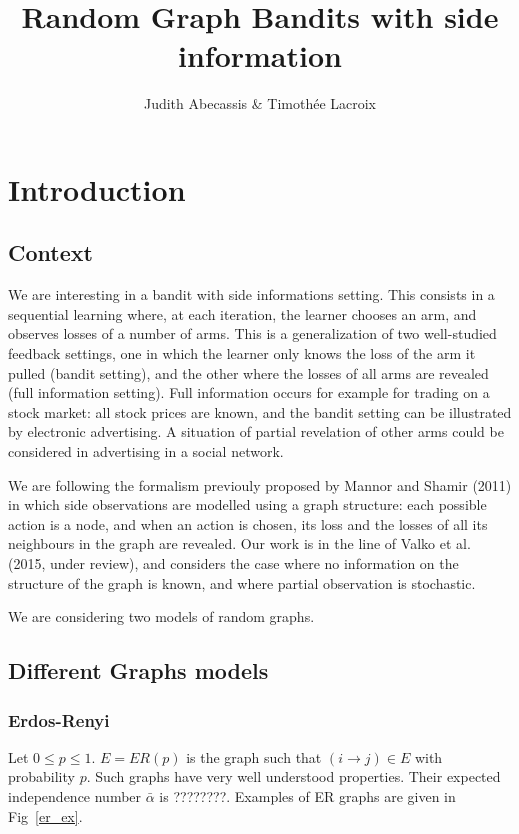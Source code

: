 \documentclass[10pt,a4paper]{scrartcl}
\author{Judith Abecassis \& Timothée Lacroix}
\title{Random Graph Bandits with side information}
\begin{document}
\maketitle

\section{Introduction}
\subsection{Context}
We are interesting in a bandit with side informations setting. This consists in a sequential learning where, at each iteration, the learner chooses an arm, and observes losses of a number of arms. This is a generalization of two well-studied feedback settings, one in which the learner only knows the loss of the arm it pulled (bandit setting), and the other where the losses of all arms are revealed (full information setting). Full information occurs for example for trading on a stock market: all stock prices are known, and the bandit setting can be illustrated by electronic advertising. A situation of partial revelation of other arms could be considered in advertising in a social network.

We are following the formalism previouly proposed by Mannor and Shamir (2011) in which side observations are modelled using a graph structure: each possible action is a node, and when an action is chosen, its loss and the losses of all its neighbours in the graph are revealed. Our work is in the line of Valko et al. (2015, under review), and considers the case where no information on the structure of the graph is known, and where partial observation is stochastic. 

We are considering two models of random graphs.

\subsection{Different Graphs models}

\subsubsection{Erdos-Renyi}
Let $0\leq p \leq 1$. $E=ER(p)$ is the graph such that $(i \rightarrow j) \in E$ with probability $p$. Such graphs have very well understood properties. Their expected independence number $\bar{\alpha}$ is ????????.
Examples of ER graphs are given in Fig~\ref{er_ex}.
\end{document}
